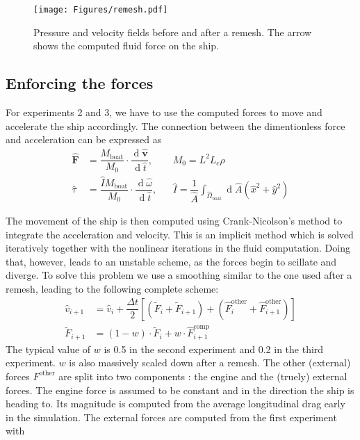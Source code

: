 \documentclass[a4paper]{article}
\DeclareMathOperator{\newdiff}{d} %
\newcommand{\dif}{\newdiff\!}
\newcommand{\fdif}[2]{\dfrac{\dif #1}{\dif #2}}
\begin{document}
\begin{figure}[hbtb]
    \centering
	\texttt{[image: Figures/remesh.pdf]}
	\caption{Pressure and velocity fields before and after a remesh. The arrow shows the computed fluid force on the ship.}
	\label{fig:remesh}
\end{figure}

\subsection{Enforcing the forces}
For experiments 2 and 3, we have to use the computed forces to move and accelerate the ship accordingly. The connection between the dimentionless force and acceleration can be expressed as
\begin{align*}
    \bm{\hat{F}} &= \dfrac{M_\text{boat}}{M_0} \cdot \fdif{\hat{\bm{v}}}{\hat{t}}, 
    && M_0 = L^2 L_c \rho \\
    \hat{\tau} &= \dfrac{\hat{I} M_\text{boat}}{M_0} \cdot \fdif{\hat{\omega}}{\hat{t}}, 
    &&\hat{I} = \dfrac{1}{\hat{A}} \int_{\hat{\Omega}_\text{boat}} \dif \hat{A} (\hat{x}^2 + \hat{y}^2)
\end{align*}

The movement of the ship is then computed using Crank-Nicolson's method to integrate the acceleration and velocity. This is an implicit method which is solved iteratively together with the nonlinear iterations in the fluid computation. Doing that, however, leads to an unstable scheme, as the forces begin to scillate and diverge. To solve this problem we use a smoothing similar to the one used after a remesh, leading to the following complete scheme:
\begin{align*}
    \hat{v}_{i+1} &= \hat{v}_{i} + \dfrac{\Delta t}{2} \left[(\tilde{F}_i + \tilde{F}_{i+1}) + (\hat{F}_{i}^\text{other} + \hat{F}_{i+1}^\text{other})\right] \\
    \tilde{F}_{i+1} &= (1-w) \cdot \tilde{F}_{i} + w \cdot \hat{F}_{i+1}^\text{comp}
\end{align*}
The typical value of $w$ is 0.5 in the second experiment and 0.2 in the third experiment. $w$ is also massively scaled down after a remesh. The other (external) forces $F^\text{other}$ are split into two components : the engine and the (truely) external forces. The engine force is assumed to be constant and in the direction the ship is heading to. Its magnitude is computed from the average longitudinal drag early in the simulation. The external forces are computed from the first experiment with
\end{document}
